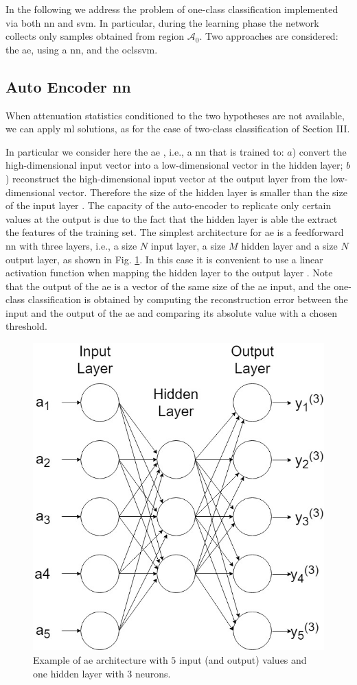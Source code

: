 \documentclass[draftcls,onecolumn,12pt]{IEEEtran}
\newcommand{\A}[1]{\mathcal{A}_#1}
\begin{document}
In the following we address the problem of  one-class classification  implemented via both \ac{nn} and \ac{svm}. In particular, during the  learning phase the network collects only samples obtained from region $\A{0}$. Two approaches are considered: the \ac{ae}, using a \ac{nn}, and the \ac{oclssvm}.
 

\subsection{Auto Encoder \ac{nn}}
\label{sec:auto}

When attenuation statistics conditioned to the two hypotheses are not available, we can apply \ac{ml} solutions, as for the case of two-class classification of Section III. 

In particular we consider here the \ac{ae} \cite{Hinton-2006}, i.e., a \ac{nn} that is trained to: $a$) convert the high-dimensional input vector into a low-dimensional vector in the hidden layer; $b$) reconstruct the high-dimensional input vector at the output layer from the low-dimensional vector. Therefore the size of the hidden layer is smaller than the size of the input layer \cite{Bourlard-88}. The capacity of the auto-encoder to replicate only certain values at the output is due to the fact that the hidden layer is able the extract the features of the training set. The simplest architecture for \ac{ae} is a feedforward \ac{nn} with three layers, i.e., a size $N$ input layer, a size $M$ hidden layer and a size $N$ output layer, as shown in Fig. \ref{fig:aeArch}. In this case it is convenient to use a linear activation function when mapping the hidden layer to the output layer \cite{goodfellow}. Note that the output of the \ac{ae} is a vector of the same size of the \ac{ae} input, and the one-class classification is obtained by computing the reconstruction error between the input and the output of the \ac{ae} and comparing its absolute value with a chosen threshold.

\begin{figure}[t]
    \centering
    \includegraphics[width=0.5\columnwidth]{AE.jpg}
    \caption{Example of \ac{ae} architecture with $5$ input (and output) values and one hidden layer with 3 neurons.} 
    \label{fig:aeArch}
\end{figure}
\end{document}
